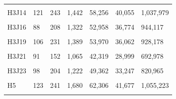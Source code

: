 \documentclass[
  a4paper,
  titlepage]{article}
\begin{document}
\begin{longtable}[t]{lllllll}
\cellcolor{gray!6}{H3J13} & \cellcolor{gray!6}{130} & \cellcolor{gray!6}{238} & \cellcolor{gray!6}{1,487} & \cellcolor{gray!6}{57,812} & \cellcolor{gray!6}{39,202} & \cellcolor{gray!6}{1,000,128}\\
 
H3J14 & 121 & 243 & 1,442 & 58,256 & 40,055 & 1,037,979\\
 
\cellcolor{gray!6}{H3J15} & \cellcolor{gray!6}{141} & \cellcolor{gray!6}{235} & \cellcolor{gray!6}{1,574} & \cellcolor{gray!6}{61,077} & \cellcolor{gray!6}{41,138} & \cellcolor{gray!6}{1,087,316}\\
 
H3J16 & 88 & 208 & 1,322 & 52,958 & 36,774 & 944,117\\
 
\cellcolor{gray!6}{H3J18} & \cellcolor{gray!6}{123} & \cellcolor{gray!6}{211} & \cellcolor{gray!6}{1,359} & \cellcolor{gray!6}{52,741} & \cellcolor{gray!6}{35,715} & \cellcolor{gray!6}{951,295}\\
 
H3J19 & 106 & 231 & 1,389 & 53,970 & 36,062 & 928,178\\
 
\cellcolor{gray!6}{H3J20} & \cellcolor{gray!6}{113} & \cellcolor{gray!6}{221} & \cellcolor{gray!6}{1,345} & \cellcolor{gray!6}{52,807} & \cellcolor{gray!6}{36,389} & \cellcolor{gray!6}{957,101}\\
 
H3J21 & 91 & 152 & 1,065 & 42,319 & 28,999 & 692,978\\
 
\cellcolor{gray!6}{H3J22} & \cellcolor{gray!6}{101} & \cellcolor{gray!6}{179} & \cellcolor{gray!6}{1,157} & \cellcolor{gray!6}{47,066} & \cellcolor{gray!6}{32,593} & \cellcolor{gray!6}{807,450}\\
 
H3J23 & 98 & 204 & 1,222 & 49,362 & 33,247 & 820,965\\
 
\cellcolor{gray!6}{H4} & \cellcolor{gray!6}{110} & \cellcolor{gray!6}{194} & \cellcolor{gray!6}{1,166} & \cellcolor{gray!6}{47,533} & \cellcolor{gray!6}{33,105} & \cellcolor{gray!6}{882,612}\\
 
H5 & 123 & 241 & 1,680 & 62,306 & 41,677 & 1,055,223\\
 
\cellcolor{gray!6}{H8} & \cellcolor{gray!6}{86} & \cellcolor{gray!6}{184} & \cellcolor{gray!6}{1,127} & \cellcolor{gray!6}{45,123} & \cellcolor{gray!6}{30,969} & \cellcolor{gray!6}{849,013}\\
 

\end{longtable}
\end{document}
